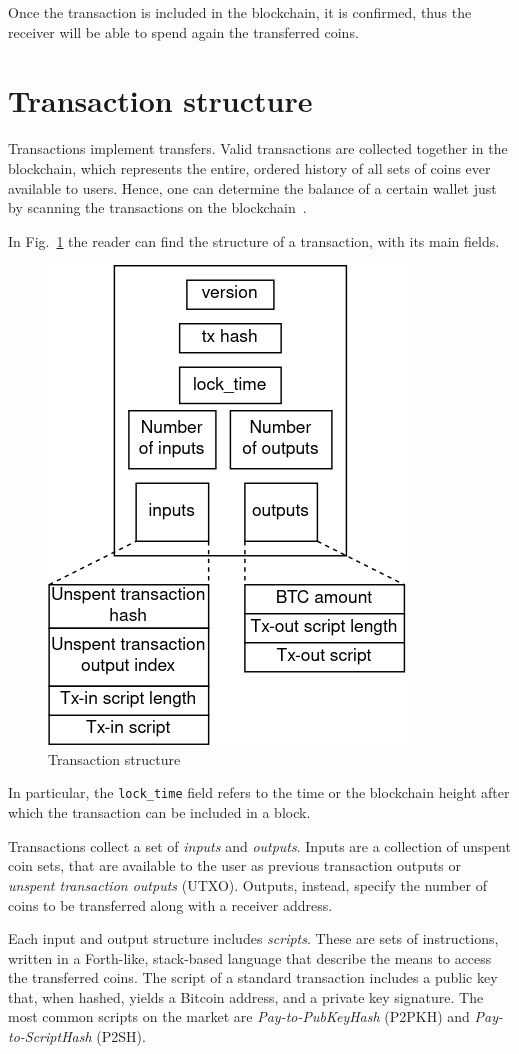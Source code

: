 Once the transaction is included in the blockchain, it is confirmed, thus the receiver will be able to spend again the transferred coins.

\section{Transaction structure}\label{sec:tx}
Transactions implement transfers. Valid transactions are collected together in the blockchain, which represents the entire, ordered history of all sets of coins ever available to users. Hence, one can determine the balance of a certain wallet just by scanning the transactions on the blockchain~\cite{tschorsch-intro-survey}.

In Fig.~\ref{fig:tx} the reader can find the structure of a transaction, with its main fields.

\begin{figure}[h]
	\includegraphics[width=.40\textwidth]{pict/txstruct.png}
	\centering
	\caption{Transaction structure}
	\label{fig:tx}
\end{figure}

In particular, the \texttt{lock\_time} field refers to the time or the blockchain height after which the transaction can be included in a block.

Transactions collect a set of \emph{inputs} and \emph{outputs}. Inputs are a collection of unspent coin sets, that are available to the user as previous transaction outputs or \textit{unspent transaction outputs} (UTXO). Outputs, instead, specify the number of coins to be transferred along with a receiver address.

Each input and output structure includes \emph{scripts}. These are sets of instructions, written in a Forth-like, stack-based language that describe the means to access the transferred coins. The script of a standard transaction includes a public key that, when hashed, yields a Bitcoin address, and a private key signature. The most common scripts on the market are \emph{Pay-to-PubKeyHash} (P2PKH) and \emph{Pay-to-ScriptHash} (P2SH).

